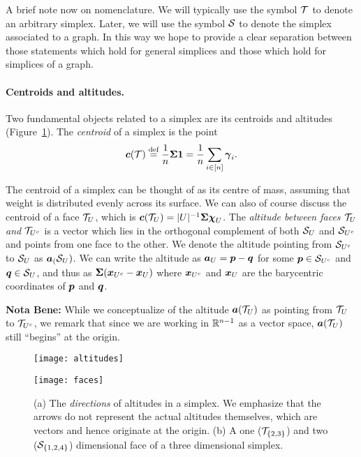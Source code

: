 A brief note now on nomenclature. We will typically  use the symbol $\mathcal{T}$ to denote an arbitrary simplex. Later, we will use the symbol $\mathcal{S}$  to denote  the simplex associated  to a  graph. In  this way we hope to provide a clear separation between those statements which hold for general simplices and those which hold for simplices of a graph. 


\paragraph{Centroids and altitudes.}
Two fundamental objects related to a simplex are its centroids and altitudes (Figure~\ref{fig:faces+altitudes}). The \emph{centroid} of a simplex is the point 
\begin{equation}
\label{eq:centroid}
\vb*{c}(\mathcal{T}) \overset{\text{def}}{=} \frac{1}{n}\boldsymbol{\Sigma} \vb{1} = \frac{1}{n}\sum_{i\in[n]}\vb*{\gamma}_i.
\end{equation} 

The centroid of a simplex can be thought of as its centre of mass, assuming that weight is distributed evenly across its surface. 
We can also of course discuss  the  centroid of a face $\mathcal{T}_U$, which is $\vb*{c}(\mathcal{T}_U) = |U|^{-1}\boldsymbol{\Sigma}\boldsymbol{\chi}_U$. 
The \emph{altitude between faces $\mathcal{T}_U$ and $\mathcal{T}_{U^c}$} is a vector which lies in the orthogonal complement of both $\mathcal{S}_U$ and $\mathcal{S}_{U^c}$ and points from one face to the other. 
We denote the altitude pointing from $\mathcal{S}_{U^c}$ to $\mathcal{S}_{U}$ as $\vb*{a}_(\mathcal{S}_U)$. We can write the altitude as $\vb*{a}_U=\vb*{p}-\vb*{q}$ for some $\vb*{p}\in \mathcal{S}_{U^c}$ and $\vb*{q}\in\mathcal{S}_{U}$, and thus as $\boldsymbol{\Sigma}(\vb*{x}_{U^c}-\vb*{x}_{U})$ where $\vb*{x}_{U^c}$ and $\vb*{x}_{U}$ are the barycentric coordinates of $\vb*{p}$ and $\vb*{q}$. 

\textbf{Nota Bene:} While  we conceptualize of the altitude $\vb*{a}(\mathcal{T}_U)$ as pointing from $\mathcal{T}_U$  to  $\mathcal{T}_{U^c}$, we  remark that since we are working in  $\mathbb{R}^{n-1}$  as  a vector  space,  $\vb*{a}(\mathcal{T}_U)$ still ``begins'' at  the origin. 

\begin{figure}
	\centering
	\begin{minipage}{0.45\textwidth}
	\centering
	\texttt{[image: altitudes]}
	\subcaption{ }
	\label{fig:altitudes}
	\end{minipage}
\hspace{0.08\textwidth}
\begin{minipage}{0.45\textwidth}
	\centering
	\texttt{[image: faces]}
	\subcaption{}
	\label{fig:faces}
\end{minipage}
\caption{(a) The \emph{directions} of altitudes in a simplex. We emphasize that the arrows do not represent the actual altitudes themselves, which  are  vectors and hence originate at the origin. (b) A one  ($\mathcal{T}_{\{2,3\}}$) and two ($\mathcal{S}_{\{1,2,4\}}$) dimensional face of a three dimensional simplex. }
\label{fig:faces+altitudes}
\end{figure}


